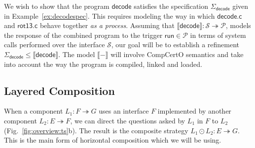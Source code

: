 \documentclass[acmsmall,nonacm]{acmart}
\newcommand{\kw}[1]{\ensuremath{ \mathsf{#1} }}
\begin{document}

\begin{example} \label{ex:decodesim} %
We wish to show that the program $\kw{decode}$
satisfies the specification $\Sigma_\kw{decode}$
given in Example~\ref{ex:decodespec}.
This requires modeling the way in which
$\kw{decode.c}$ and $\kw{rot13.c}$ behave together
\emph{as a process}.
Assuming that
$\llbracket \kw{decode} \rrbracket :
 \mathcal{S} \twoheadrightarrow \mathcal{P}$,
models the response of the combined program
to the trigger $\kw{run} \in \mathcal{P}$
in terms of system calls performed over the interface $\mathcal{S}$,
our goal will be to establish a refinement
$
  \Sigma_\kw{decode}
  \le
  \llbracket \kw{decode} \rrbracket
$.
The model $\llbracket - \rrbracket$ will involve CompCertO semantics
and take into account the way the program is
compiled, linked and loaded.
\end{example}


\subsection{Layered Composition} %

When a component $L_1 : F \twoheadrightarrow G$
uses an interface $F$ implemented by
another component $L_2 : E \twoheadrightarrow F$,
we can direct the questions asked by $L_1$ in $F$ to $L_2$
(Fig.~\ref{fig:overview:ts}b).
The result is the composite strategy
$L_1 \odot L_2 : E \twoheadrightarrow G$. %
This is the main form of horizontal composition which we will be using.
\end{document}
